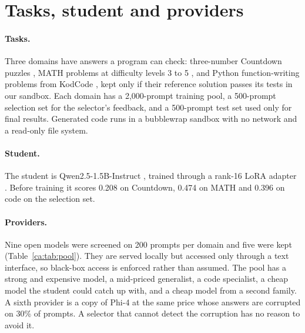 \section{Tasks, student and providers}

\paragraph{Tasks.} Three domains have answers a program can check: three-number Countdown
puzzles \autocite{patino_gold_2025}, MATH problems at difficulty levels 3 to 5
\autocite{hendrycks_math_2021}, and Python function-writing problems from KodCode
\autocite{xu_kodcode_2025}, kept only if their reference solution passes its tests in our
sandbox. Each domain has a 2,000-prompt training pool, a 500-prompt selection set for the
selector's feedback, and a 500-prompt test set used only for final results. Generated code
runs in a bubblewrap sandbox with no network and a read-only file system.

\paragraph{Student.} The student is Qwen2.5-1.5B-Instruct \autocite{qwen_qwen25_2024},
trained through a rank-16 LoRA adapter \autocite{hu_lora_2022}. Before training it scores 0.208 on
Countdown, 0.474 on MATH and 0.396 on code on the selection set.

\paragraph{Providers.} Nine open models were screened on 200 prompts per domain and five
were kept (Table~\ref{ca:tab:pool}). They are served locally but accessed only through a
text interface, so black-box access is enforced rather than assumed. The pool has a strong
and expensive model, a mid-priced generalist, a code specialist, a cheap model the student
could catch up with, and a cheap model from a second family. A sixth provider is a copy of
Phi-4 at the same price whose answers are corrupted on 30\% of prompts. A selector that
cannot detect the corruption has no reason to avoid it.


